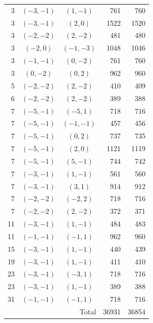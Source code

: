 \documentclass[12pt]{article}
\numberwithin{equation}{section}
\begin{document}
\begin{longtable}{rccrr}
3 & $(-3,-1)$ & $(1,-1)$ & 761 & 760 \\
3 & $(-3,-1)$ & $(2,0)$ & 1522 & 1520 \\
3 & $(-2,-2)$ & $(2,-2)$ & 481 & 480 \\
3 & $(-2,0)$ & $(-1,-3)$ & 1048 & 1046 \\
3 & $(-1,-1)$ & $(0,-2)$ & 761 & 760 \\
3 & $(0,-2)$ & $(0,2)$ & 962 & 960 \\
5 & $(-2,-2)$ & $(2,-2)$ & 410 & 409 \\
6 & $(-2,-2)$ & $(2,-2)$ & 389 & 388 \\
7 & $(-5,-1)$ & $(-5,1)$ & 718 & 716 \\
7 & $(-5,-1)$ & $(-1,-1)$ & 457 & 456 \\
7 & $(-5,-1)$ & $(0,2)$ & 737 & 735 \\
7 & $(-5,-1)$ & $(2,0)$ & 1121 & 1119 \\
7 & $(-5,-1)$ & $(5,-1)$ & 744 & 742 \\
7 & $(-3,-1)$ & $(1,-1)$ & 561 & 560 \\
7 & $(-3,-1)$ & $(3,1)$ & 914 & 912 \\
7 & $(-2,-2)$ & $(-2,2)$ & 718 & 716 \\
7 & $(-2,-2)$ & $(2,-2)$ & 372 & 371 \\
11 & $(-3,-1)$ & $(1,-1)$ & 484 & 483 \\
11 & $(-1,-1)$ & $(-1,1)$ & 962 & 960 \\
15 & $(-3,-1)$ & $(1,-1)$ & 440 & 439 \\
19 & $(-3,-1)$ & $(1,-1)$ & 411 & 410 \\
23 & $(-3,-1)$ & $(-3,1)$ & 718 & 716 \\
23 & $(-3,-1)$ & $(1,-1)$ & 389 & 388 \\
31 & $(-1,-1)$ & $(-1,1)$ & 718 & 716 \\
\midrule
\multicolumn{3}{r}{Total} & 36931 & 36854\\
\end{longtable}
\end{document}
